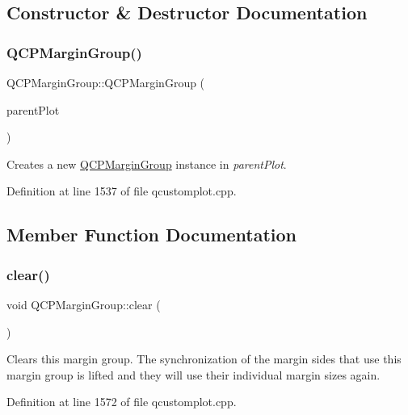 \subsection{Constructor \& Destructor Documentation}
\mbox{\label{class_q_c_p_margin_group_ac481c20678ec5b305d6df330715f4b7b}} 
\subsubsection{\texorpdfstring{Q\+C\+P\+Margin\+Group()}{QCPMarginGroup()}}
{\footnotesize\ttfamily Q\+C\+P\+Margin\+Group\+::\+Q\+C\+P\+Margin\+Group (\begin{DoxyParamCaption}\item[{\hyperlink{class_q_custom_plot}{Q\+Custom\+Plot} $\ast$}]{parent\+Plot }\end{DoxyParamCaption})}

Creates a new \hyperlink{class_q_c_p_margin_group}{Q\+C\+P\+Margin\+Group} instance in {\itshape parent\+Plot}. 

Definition at line 1537 of file qcustomplot.\+cpp.



\subsection{Member Function Documentation}
\mbox{\label{class_q_c_p_margin_group_a144b67f216e4e86c3a3a309e850285fe}} 
\subsubsection{\texorpdfstring{clear()}{clear()}}
{\footnotesize\ttfamily void Q\+C\+P\+Margin\+Group\+::clear (\begin{DoxyParamCaption}{ }\end{DoxyParamCaption})}

Clears this margin group. The synchronization of the margin sides that use this margin group is lifted and they will use their individual margin sizes again. 

Definition at line 1572 of file qcustomplot.\+cpp.

